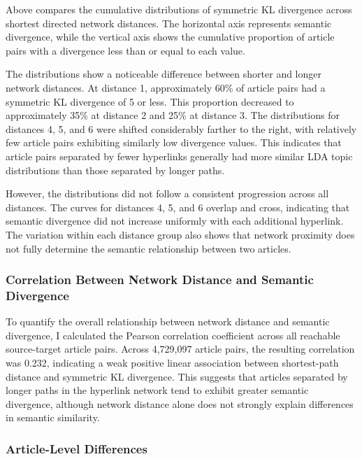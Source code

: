 \documentclass[
  letterpaper,
  DIV=11,
  numbers=noendperiod]{scrartcl}
\begin{document}
Above compares the cumulative distributions of symmetric KL divergence
across shortest directed network distances. The horizontal axis
represents semantic divergence, while the vertical axis shows the
cumulative proportion of article pairs with a divergence less than or
equal to each value.

The distributions show a noticeable difference between shorter and
longer network distances. At distance 1, approximately 60\% of article
pairs had a symmetric KL divergence of 5 or less. This proportion
decreased to approximately 35\% at distance 2 and 25\% at distance 3.
The distributions for distances 4, 5, and 6 were shifted considerably
farther to the right, with relatively few article pairs exhibiting
similarly low divergence values. This indicates that article pairs
separated by fewer hyperlinks generally had more similar LDA topic
distributions than those separated by longer paths.

However, the distributions did not follow a consistent progression
across all distances. The curves for distances 4, 5, and 6 overlap and
cross, indicating that semantic divergence did not increase uniformly
with each additional hyperlink. The variation within each distance group
also shows that network proximity does not fully determine the semantic
relationship between two articles.

\subsubsection{Correlation Between Network Distance and Semantic
Divergence}\label{correlation-between-network-distance-and-semantic-divergence}

To quantify the overall relationship between network distance and
semantic divergence, I calculated the Pearson correlation coefficient
across all reachable source-target article pairs. Across 4,729,097
article pairs, the resulting correlation was 0.232, indicating a weak
positive linear association between shortest-path distance and symmetric
KL divergence. This suggests that articles separated by longer paths in
the hyperlink network tend to exhibit greater semantic divergence,
although network distance alone does not strongly explain differences in
semantic similarity.

\subsubsection{Article-Level
Differences}\label{article-level-differences}
\end{document}
